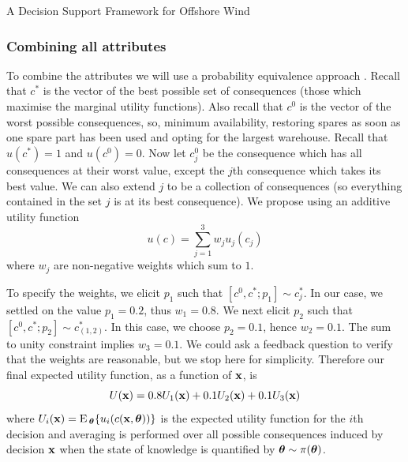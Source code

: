 \begin{chapter}{A Decision Support Framework for Offshore Wind \label{Ch:ds-for-ow}}
\subsubsection{Combining all attributes}
To combine the attributes we will use a probability equivalence
 approach \citep{Gonzalez2018}. Recall that $c^{*}$ is the vector of the best possible set of consequences (those which maximise the marginal utility functions). Also recall that $c^{0}$ is the vector of the worst possible consequences, so, minimum availability, restoring spares as soon as one spare part has been used and opting for the largest warehouse. Recall that $u(c^{*}) = 1$ and $u(c^0)= 0$. Now let $c^{0}_{j}$ be the consequence which has all consequences at their worst value, except the $j$th consequence which takes its best value. We can also extend $j$ to be a collection of consequences (so everything contained in the set $j$ is at its best consequence). We propose using an additive utility function
\begin{equation}
 u(c) = \sum_{j=1}^3 w_j u_j(c_j)
\end{equation}
where $w_j$ are non-negative weights which sum to $1$.

To specify the weights, we elicit $p_1$ such that $[c^{0}, c^{*}; p_1] \sim c^{*}_{j}$. In our case, we settled on the value $p_1 = 0.2$, thus $w_1 = 0.8$. We next elicit $p_2$ such that $[c^{0}, c^{*}; p_2] \sim c^{*}_{(1,2)}$. In this case, we choose $p_2 = 0.1$, hence $w_2 = 0.1$. The sum to unity constraint implies $w_3 = 0.1$. We could ask a feedback question to verify that the weights are reasonable, but we stop here for simplicity. Therefore our final expected utility function, as a function of $\mathbf{x}$, is
\begin{equation}
 U(\mathbf{x}) =  0.8U_1(\mathbf{x}) + 0.1 U_2(\mathbf{x}) + 0.1 U_3(\mathbf{x})
\end{equation}
where $U_i(\mathbf{x}) = \textrm{E}\,_{\bm{\theta}}\{u_i(c(\mathbf{x}, \bm{\theta}))\}$ is the expected utility function for the $i$th decision and averaging is performed over all possible consequences induced by decision $\mathbf{x}$ when the state of knowledge is quantified by $\bm{\theta} \sim \pi(\bm{\theta})$.

\end{chapter}
